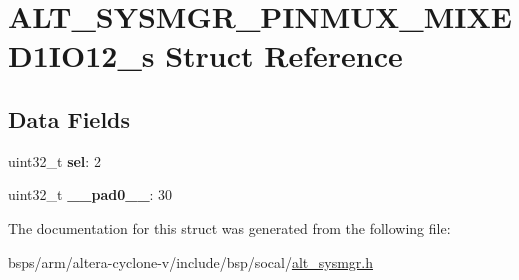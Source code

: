 \hypertarget{structALT__SYSMGR__PINMUX__MIXED1IO12__s}{}\section{A\+L\+T\+\_\+\+S\+Y\+S\+M\+G\+R\+\_\+\+P\+I\+N\+M\+U\+X\+\_\+\+M\+I\+X\+E\+D1\+I\+O12\+\_\+s Struct Reference}
\label{structALT__SYSMGR__PINMUX__MIXED1IO12__s}
\subsection*{Data Fields}
\begin{DoxyCompactItemize}
\item 
\mbox{\label{structALT__SYSMGR__PINMUX__MIXED1IO12__s_aef89ceeeb9861fb8568a2a4d5de2b7c8}} 
uint32\+\_\+t {\bfseries sel}\+: 2
\item 
\mbox{\label{structALT__SYSMGR__PINMUX__MIXED1IO12__s_ae0dcbb40b965b55a1530db49f22e6b46}} 
uint32\+\_\+t {\bfseries \+\_\+\+\_\+pad0\+\_\+\+\_\+}\+: 30
\end{DoxyCompactItemize}


The documentation for this struct was generated from the following file\+:\begin{DoxyCompactItemize}
\item 
bsps/arm/altera-\/cyclone-\/v/include/bsp/socal/\mbox{\hyperlink{alt__sysmgr_8h}{alt\+\_\+sysmgr.\+h}}\end{DoxyCompactItemize}
